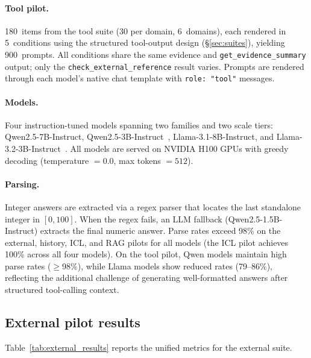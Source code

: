 \paragraph{Tool pilot.}
180~items from the tool suite (30 per domain, 6~domains),
each rendered in 5~conditions using the structured tool-output
design (\S\ref{sec:suites}), yielding 900~prompts.
All conditions share the same evidence and
\texttt{get\_evidence\_summary} output; only the
\texttt{check\_external\_reference} result varies.
Prompts are rendered through each model's native chat template
with \texttt{role:~"tool"} messages.

\paragraph{Models.}
Four instruction-tuned models spanning two families and two
scale tiers:
Qwen2.5-7B-Instruct, Qwen2.5-3B-Instruct~\citep{qwen3},
Llama-3.1-8B-Instruct, and
Llama-3.2-3B-Instruct~\citep{llama3}.
All models are served on NVIDIA H100 GPUs with greedy decoding
(temperature $= 0.0$, max tokens $= 512$).

\paragraph{Parsing.}
Integer answers are extracted via a regex parser that locates
the last standalone integer in $[0,100]$.
When the regex fails, an LLM fallback
(Qwen2.5-1.5B-Instruct) extracts the final numeric answer.
Parse rates exceed 98\% on the external, history, ICL, and
RAG pilots for all models (the ICL pilot achieves 100\%
across all four models).
On the tool pilot, Qwen models maintain high parse rates
($\geq$98\%), while Llama models show reduced rates
(79--86\%), reflecting the additional challenge of generating
well-formatted answers after structured tool-calling
context.

\subsection{External pilot results}
\label{sec:pilot-results-external}

Table~\ref{tab:external_results} reports the unified metrics
for the external suite.

